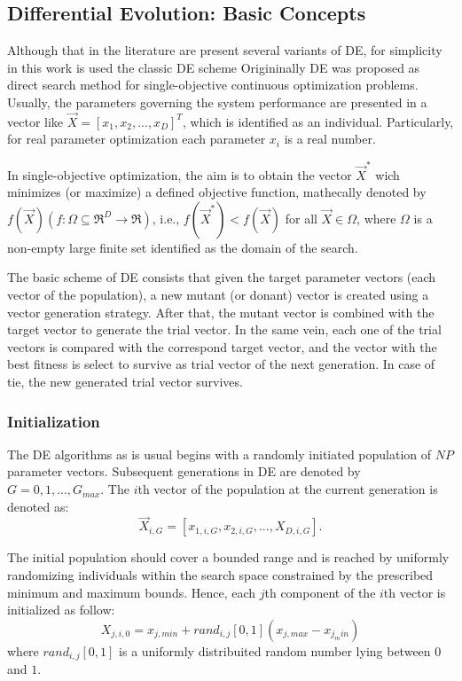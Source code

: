 \subsection{Differential Evolution: Basic Concepts}
%
Although that in the literature are present several variants of DE, for simplicity in this work is used the classic DE scheme \cite{das2011differential}
%
Origininally DE was proposed as direct search method for single-objective continuous optimization problems.
%
Usually, the parameters governing the system performance are presented in a vector like $\vec{X} = [x_1, x_2, ..., x_D ]^T$, which is identified as an individual.
%
Particularly, for real parameter optimization each parameter $x_i$ is a real number.
%

In single-objective optimization, the aim is to obtain the vector $\vec{X}^*$ wich minimizes (or maximize) a defined objective function, mathecally denoted by $f(\vec{X})(f : \Omega \subseteq \Re^D \rightarrow \Re)$, i.e., $f(\vec{X}^*) < f(\vec{X})$ for all $\vec{X} \in \Omega$, where $\Omega$ is a non-empty large finite set identified as the domain of the search.
%

The basic scheme of DE consists that given the target parameter vectors (each vector of the population), a new mutant (or donant) vector is created using a vector generation strategy.
%
After that, the mutant vector is combined with the target vector to generate the trial vector.
%
In the same vein, each one of the trial vectors is compared with the correspond target vector, and the vector with the best fitness is select to survive as trial vector of the next generation.
%
In case of tie, the new generated trial vector survives.


\subsubsection{Initialization}


The DE algorithms as is usual begins with a randomly initiated population of $NP$ parameter vectors.
%
Subsequent generations in DE are denoted by $G= 0,1, ..., G_{max}$.
%
The $i$th vector of the population at the current generation is denoted as:
\begin{equation} 
\vec{X}_{i,G} = [x_{1,i,G}, x_{2,i,G},..., X_{D,i, G}].
\end{equation}
%

The initial population should cover a bounded range and is reached by uniformly randomizing individuals within the search space constrained by the prescribed minimum and maximum bounds.
%
Hence, each $j$th component of the $i$th vector is initialized as follow:
\begin{equation}
X_{j,i,0} = x_{j,min} + rand_{i,j}[0,1] (x_{j,max} - x_{j_min})
\end{equation}
where $rand_{i,j}[0,1]$ is a uniformly distribuited random number lying between $0$ and $1$.

